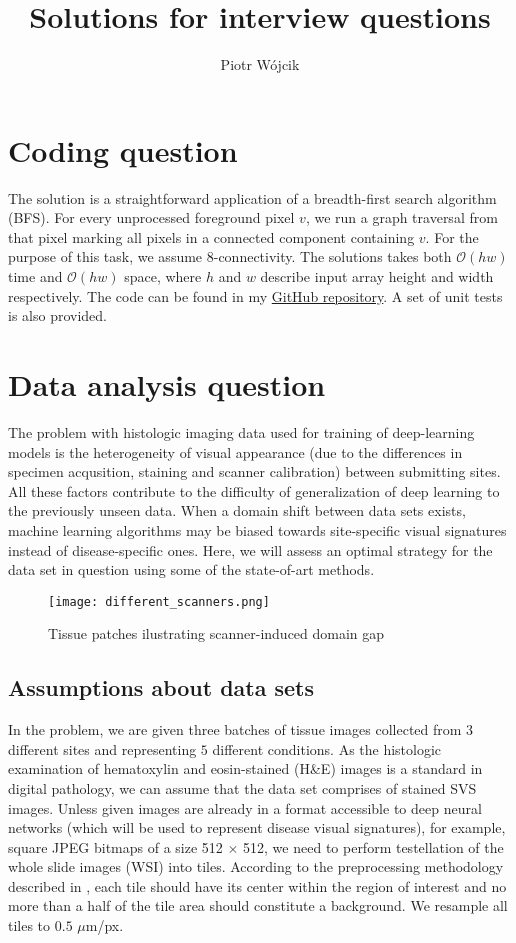 \documentclass[11pt]{article}
\title{Solutions for interview questions}
\author{Piotr Wójcik}
\begin{document}
\maketitle
\section{Coding question}
The solution is a straightforward application of a breadth-first search algorithm (BFS). For every unprocessed foreground pixel $v$, 
we run a graph traversal from that pixel marking all pixels in a connected component containing $v$. For the purpose of this task, we assume $8$-connectivity.
The solutions takes both $\mathcal{O}(hw)$ time and $\mathcal{O}(hw)$ space, where $h$ and $w$ describe input array height and width respectively. 
The code can be found in my \href{https://github.com/piotrmwojcik/interview_questions}{GitHub repository}. A set of unit tests is also provided.
\section{Data analysis question}
The problem with histologic imaging data used for training of deep-learning models is the heterogeneity of visual appearance (due to the differences in specimen acqusition, staining and scanner calibration) between submitting sites. 
All these factors contribute to the difficulty of generalization of deep learning to the previously unseen data. When a domain shift between data sets exists, machine learning algorithms may be biased towards site-specific visual signatures instead of disease-specific ones. 
Here, we will assess an optimal strategy for the data set in question using some of the state-of-art methods.
\begin{figure}[h]
\centering
\texttt{[image: different\_scanners.png]}
				\caption{Tissue patches ilustrating scanner-induced domain gap \cite{auber21}}
\end{figure}
\subsection{Assumptions about data sets}
In the problem, we are given three batches of tissue images collected from $3$ different sites and representing $5$ different conditions.
As the histologic examination of hematoxylin and eosin-stained (H\&E) images is a standard in digital pathology, we can assume that the data set comprises of stained SVS images.
Unless given images are already in a format accessible to deep neural networks (which will be used to represent disease visual signatures), for example, square JPEG bitmaps of a size 512 $\times$ 512,
we need to perform testellation of the whole slide images (WSI) into tiles. According to the preprocessing methodology described in \cite{aachen20}, each tile should have its center within 
the region of interest and no more than a half of the tile area should constitute a background. We resample all tiles to $0.5$ $\mu$m/px.
\end{document}
